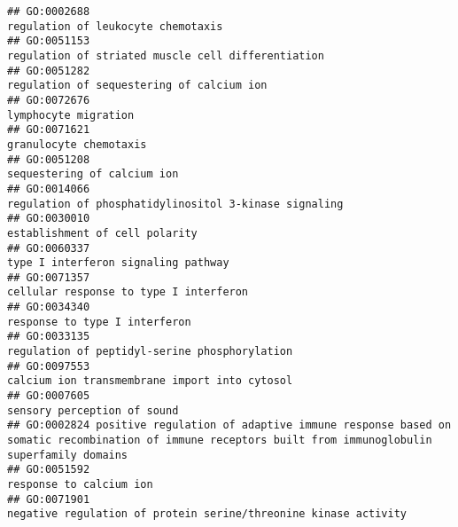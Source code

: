 \documentclass[
]{article}
\begin{document}
\begin{verbatim}
## GO:0002688                                                                                                               regulation of leukocyte chemotaxis
## GO:0051153                                                                                               regulation of striated muscle cell differentiation
## GO:0051282                                                                                                        regulation of sequestering of calcium ion
## GO:0072676                                                                                                                             lymphocyte migration
## GO:0071621                                                                                                                           granulocyte chemotaxis
## GO:0051208                                                                                                                      sequestering of calcium ion
## GO:0014066                                                                                            regulation of phosphatidylinositol 3-kinase signaling
## GO:0030010                                                                                                                   establishment of cell polarity
## GO:0060337                                                                                                              type I interferon signaling pathway
## GO:0071357                                                                                                           cellular response to type I interferon
## GO:0034340                                                                                                                    response to type I interferon
## GO:0033135                                                                                                    regulation of peptidyl-serine phosphorylation
## GO:0097553                                                                                                    calcium ion transmembrane import into cytosol
## GO:0007605                                                                                                                      sensory perception of sound
## GO:0002824 positive regulation of adaptive immune response based on somatic recombination of immune receptors built from immunoglobulin superfamily domains
## GO:0051592                                                                                                                          response to calcium ion
## GO:0071901                                                                                  negative regulation of protein serine/threonine kinase activity

\end{verbatim}
\end{document}
